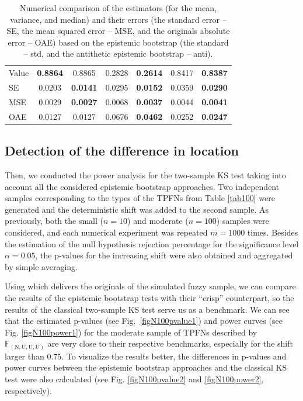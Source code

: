 \begin{table}[htbp]
\begin{tabular}{l|cc|cc|cc}
Value & \textbf{0.8864} & 0.8865 & 0.2828 & \textbf{0.2614} & 0.8417 & \textbf{0.8387} \\ 
  SE & 0.0203 & \textbf{0.0141} & 0.0295 & \textbf{0.0152} & 0.0359 & \textbf{0.0290} \\ 
  MSE & 0.0029 & \textbf{0.0027} & 0.0068 & \textbf{0.0037} & 0.0044 & \textbf{0.0041} \\ 
  OAE & 0.0127 & 0.0127 & 0.0676 & \textbf{0.0462} & 0.0252 & \textbf{0.0247} \\ 

   \hline
\end{tabular}
\caption{Numerical comparison of the estimators (for the mean, variance, and median) and their errors (the standard error -- SE, the mean squared error -- MSE, and the originals absolute error -- OAE) based on the epistemic bootstrap (the standard -- std,  and the antithetic epistemic bootstrap -- anti).}\label{tab200}
\end{table}




\subsection{Detection of the difference in location}


Then, we conducted the power analysis for the two-sample KS test taking into account all the considered epistemic bootstrap approaches.
Two independent samples corresponding to the types of the TPFNs from Table \ref{tab100} were generated and the deterministic shift was added to the second sample.
As previously, both the small ($n=10$) and moderate ($n=100$) samples were considered, and each numerical experiment was repeated $m=1000$ times.
Besides the estimation of the null hypothesis rejection percentage for the significance level $\alpha =0.05$, the p-values for the increasing shift were also obtained and aggregated by simple averaging.

Using  which delivers the originals of the simulated fuzzy sample, we can compare the results of the epistemic bootstrap tests with their ``crisp'' counterpart, so the results of the classical two-sample KS test serve us as a benchmark.
We can see that the estimated p-values (see Fig.~\ref{figN100pvalue1}) and power curves (see Fig. \ref{figN100power1}) for the moderate sample of TPFNs described by $\mathbb{F}_{(\mathrm{N,U,U,U})}$ are very close to their respective benchmarks, especially for the shift larger than 0.75.
To visualize the results better, the differences in p-values and power curves between the epistemic bootstrap approaches and the classical KS test were also calculated (see Fig. \ref{figN100pvalue2} and \ref{figN100power2}, respectively).
   

